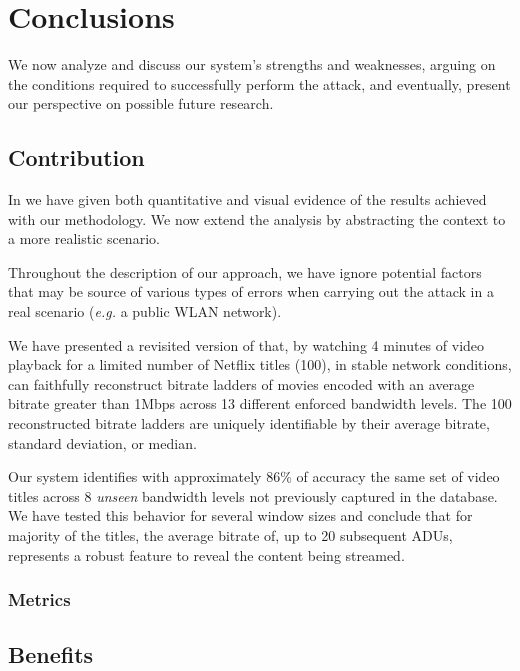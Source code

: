 \chapter{Conclusions}\label{sec:conclusion}

We now analyze and discuss our system's strengths and weaknesses, arguing on
the conditions required to successfully perform the attack, and eventually,
present our perspective on possible future research.

\section{Contribution}

In  we have given both quantitative and visual evidence of the
results achieved with our methodology. We now extend the analysis by abstracting
the context to a more realistic scenario. 

Throughout the description of our approach, we have ignore potential factors
that may be source of various types of errors when carrying out the attack in a
real scenario (\emph{e.g.} a public WLAN network). 

We have presented a revisited version of \cite{netflix-real-time} that, by
watching 4 minutes of video playback for a limited number of Netflix titles
(100), in stable network conditions, can faithfully reconstruct bitrate ladders
of movies encoded with an average bitrate greater than 1Mbps across 13
different enforced bandwidth levels. The 100 reconstructed bitrate ladders are
uniquely identifiable by their average bitrate, standard deviation, or median.

Our system identifies with approximately 86\% of accuracy the same set of
video titles across 8 \emph{unseen} bandwidth levels not previously captured in the
database. We have tested this behavior for several window sizes and conclude
that for majority of the titles, the average bitrate of, up to 20 subsequent
ADUs, represents a robust feature to reveal the content being streamed.

\subsection{Metrics}

\section{Benefits}


